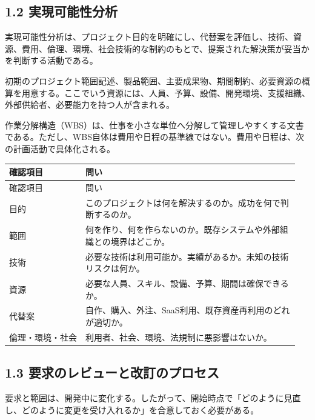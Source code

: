 \documentclass[a4paper,11pt]{ltjsarticle}
\begin{document}
\subsection{1.2 実現可能性分析}
実現可能性分析は、プロジェクト目的を明確にし、代替案を評価し、技術、資源、費用、倫理、環境、社会技術的な制約のもとで、提案された解決策が妥当かを判断する活動である。

初期のプロジェクト範囲記述、製品範囲、主要成果物、期間制約、必要資源の概算を用意する。ここでいう資源には、人員、予算、設備、開発環境、支援組織、外部供給者、必要能力を持つ人が含まれる。

作業分解構造（WBS）は、仕事を小さな単位へ分解して管理しやすくする文書である。ただし、WBS自体は費用や日程の基準線ではない。費用や日程は、次の計画活動で具体化される。

\begin{longtable}{>{\raggedright\arraybackslash}p{0.25\linewidth}>{\raggedright\arraybackslash}p{0.70\linewidth}}
\toprule
確認項目 & 問い \\
\midrule
\endfirsthead
\toprule
確認項目 & 問い \\
\midrule
\endhead
目的 & このプロジェクトは何を解決するのか。成功を何で判断するのか。 \\
範囲 & 何を作り、何を作らないのか。既存システムや外部組織との境界はどこか。 \\
技術 & 必要な技術は利用可能か。実績があるか。未知の技術リスクは何か。 \\
資源 & 必要な人員、スキル、設備、予算、期間は確保できるか。 \\
代替案 & 自作、購入、外注、SaaS利用、既存資産再利用のどれが適切か。 \\
倫理・環境・社会 & 利用者、社会、環境、法規制に悪影響はないか。 \\
\bottomrule
\end{longtable}

\begin{center}
\end{center}

\subsection{1.3 要求のレビューと改訂のプロセス}
要求と範囲は、開発中に変化する。したがって、開始時点で「どのように見直し、どのように変更を受け入れるか」を合意しておく必要がある。
\end{document}
